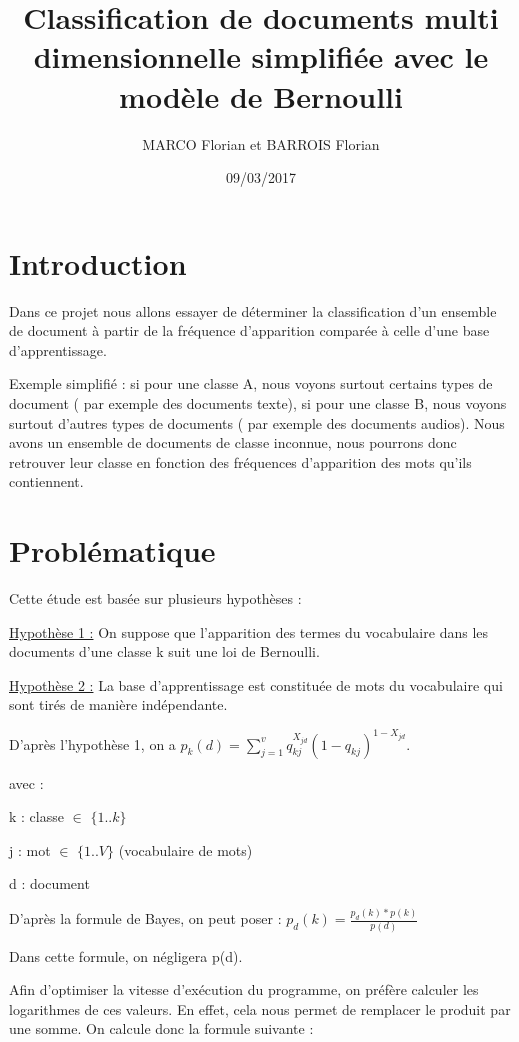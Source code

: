 \documentclass[a4paper,11pt]{article}
\title{Classification de documents multi dimensionnelle simplifiée avec le modèle de Bernoulli}
\author{MARCO Florian et BARROIS Florian}
\date{09/03/2017}
\begin{document}
\maketitle

\section{Introduction}

Dans ce projet nous allons essayer de déterminer la classification d'un ensemble de document à partir de la fréquence d'apparition comparée à celle d'une base d'apprentissage.

Exemple simplifié : si pour une classe A, nous voyons surtout certains types de document ( par exemple des documents texte), si pour une classe B, nous voyons surtout d'autres types de documents ( par exemple des documents audios). 
Nous avons un ensemble de documents de classe inconnue, nous pourrons donc retrouver leur classe en fonction des fréquences d'apparition des mots qu'ils contiennent.

\section{Problématique}

Cette étude est basée sur plusieurs hypothèses :

\underline{Hypothèse 1 :} On suppose que l'apparition des termes du vocabulaire dans les documents d'une classe k suit une loi de Bernoulli.

\underline{Hypothèse 2 :} La base d'apprentissage est constituée de mots du vocabulaire qui sont tirés de manière indépendante.

D'après l'hypothèse 1, on a $ p_{k}(d)=\sum\limits^{v}_{j=1}q_{kj}^{X_{jd}}{(1-q_{kj})}^{1-X_{jd}}.$


avec : 

	   k : classe $\in$ {$\{1..k\}$}

	   j : mot $\in$ {$\{1..V\}$} (vocabulaire de mots)
	   
	   d : document


D'après la formule de Bayes, on peut poser : $p_d(k) = \frac{p_d(k) * p(k)}{p(d)}$

Dans cette formule, on négligera p(d).

Afin d'optimiser la vitesse d'exécution du programme, on préfère calculer les logarithmes de ces valeurs. En effet, cela nous permet de remplacer le produit par une somme. On calcule donc la formule suivante :
\end{document}
